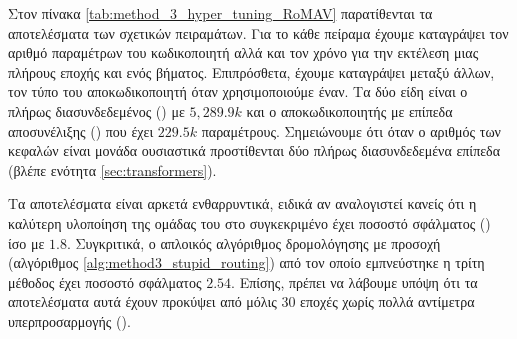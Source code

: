 Στον πίνακα \ref{tab:method_3_hyper_tuning_RoMAV} παρατίθενται τα αποτελέσματα των σχετικών πειραμάτων. Για το κάθε πείραμα έχουμε καταγράψει τον αριθμό παραμέτρων του κωδικοποιητή αλλά και τον χρόνο για την εκτέλεση μιας πλήρους εποχής και ενός βήματος. Επιπρόσθετα, έχουμε καταγράψει μεταξύ άλλων, τον τύπο του αποκωδικοποιητή όταν χρησιμοποιούμε έναν. Τα δύο είδη είναι ο πλήρως διασυνδεδεμένος () με $5,289.9k$ και ο αποκωδικοποιητής με επίπεδα αποσυνέλιξης () που έχει $229.5k$ παραμέτρους. Σημειώνουμε ότι όταν ο αριθμός των κεφαλών είναι μονάδα ουσιαστικά προστίθενται δύο πλήρως διασυνδεδεμένα επίπεδα (βλέπε ενότητα \ref{sec:transformers}).

\begin{table}[H]
    \begin{center}
    \end{center}
    \caption[]{\label{tab:method_3_hyper_tuning_RoMAV}Αποτελέσματα πειραμάτων για την εύρεση των βέλτιστων υπερπαραμέτρων του αλγορίθμου  αρχιτεκτονικής  στο σύνολο δεδομένων . Τα πειράματα αυτά πραγματοποιήθηκαν για 30 εποχές με μέγεθος δέσμης ίσο με 8.} 
\end{table}

Τα αποτελέσματα είναι αρκετά ενθαρρυντικά, ειδικά αν αναλογιστεί κανείς ότι η καλύτερη υλοποίηση της ομάδας του  στο συγκεκριμένο  έχει ποσοστό σφάλματος () ίσο με $1.8$. Συγκριτικά, ο απλοικός αλγόριθμος δρομολόγησης με προσοχή (αλγόριθμος \ref{alg:method3_stupid_routing}) από τον οποίο εμπνεύστηκε η τρίτη μέθοδος έχει ποσοστό σφάλματος $2.54$. Επίσης, πρέπει να λάβουμε υπόψη ότι τα αποτελέσματα αυτά έχουν προκύψει από μόλις 30 εποχές χωρίς πολλά αντίμετρα υπερπροσαρμογής ().\par

